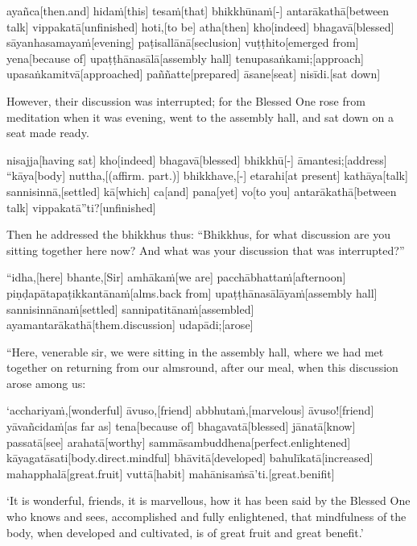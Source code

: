 \begin{samepage}
\begingl[glneveryline={\PaliGlossA,\PaliGlossB}]
ayañca[then.and] hidaṁ[this] tesaṁ[that] bhikkhūnaṁ[-] antarākathā[between talk] vippakatā[unfinished] hoti,[to be] atha[then] kho[indeed] bhagavā[blessed] sāyanhasamayaṁ[evening] paṭisallānā[seclusion] vuṭṭhito[emerged from] yena[because of] upaṭṭhānasālā[assembly hall] tenupasaṅkami;[approach] upasaṅkamitvā[approached] paññatte[prepared] āsane[seat] nisīdi.[sat down]
\endgl
\nopagebreak
\linespread{0.5}
\begin{spacin}{0.2}
{\PaliGlossFT However, their discussion was interrupted; for the Blessed One rose from meditation when it was evening, went to the assembly hall, and sat down on a seat made ready.}
\end{spacin}
\vskip 12pt
\end{samepage}
\begin{samepage}
\begingl[glneveryline={\PaliGlossA,\PaliGlossB}]
nisajja[having sat] kho[indeed] bhagavā[blessed] bhikkhū[-] āmantesi;[address] “kāya[body] nuttha,[(affirm. part.)] bhikkhave,[-] etarahi[at present] kathāya[talk] sannisinnā,[settled] kā[which] ca[and] pana[yet] vo[to you] antarākathā[between talk] vippakatā”ti?[unfinished]
\endgl
\nopagebreak
\linespread{0.5}
\begin{spacin}{0.2}
{\PaliGlossFT Then he addressed the bhikkhus thus: “Bhikkhus, for what discussion are you sitting together here now? And what was your discussion that was interrupted?”}
\end{spacin}
\vskip 12pt
\end{samepage}
\begin{samepage}
\begingl[glneveryline={\PaliGlossA,\PaliGlossB}]
“idha,[here] bhante,[Sir] amhākaṁ[we are] pacchābhattaṁ[afternoon] piṇḍapātapaṭikkantānaṁ[alms.back from] upaṭṭhānasālāyaṁ[assembly hall] sannisinnānaṁ[settled] sannipatitānaṁ[assembled] ayamantarākathā[them.discussion] udapādi;[arose]
\endgl
\nopagebreak
\linespread{0.5}
\begin{spacin}{0.2}
{\PaliGlossFT “Here, venerable sir, we were sitting in the assembly hall, where we had met together on returning from our almsround, after our meal, when this discussion arose among us:}
\end{spacin}
\vskip 12pt
\end{samepage}
\begin{samepage}
\begingl[glneveryline={\PaliGlossA,\PaliGlossB}]
‘acchariyaṁ,[wonderful] āvuso,[friend] abbhutaṁ,[marvelous] āvuso![friend] yāvañcidaṁ[as far as] tena[because of] bhagavatā[blessed] jānatā[know] passatā[see] arahatā[worthy] sammāsambuddhena[perfect.enlightened] kāyagatāsati[body.direct.mindful] bhāvitā[developed] bahulīkatā[increased] mahapphalā[great.fruit] vuttā[habit] mahānisaṁsā’ti.[great.benifit]
\endgl
\nopagebreak
\linespread{0.5}
\begin{spacin}{0.2}
{\PaliGlossFT ‘It is wonderful, friends, it is marvellous, how it has been said by the Blessed One who knows and sees, accomplished and fully enlightened, that mindfulness of the body, when developed and cultivated, is of great fruit and great benefit.’}
\end{spacin}
\vskip 12pt
\end{samepage}
